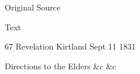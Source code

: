 {			\begin{description}
				\item[Original Source]
			\end{description}
			
			
			\begin{description}
				\item[Text]
			\end{description}
			
				\begin{tightcenter}
				67 Revelation Kirtland Sept 11 1831
				\end{tightcenter}
				
				Directions to the Elders \&c \&c
				
}
